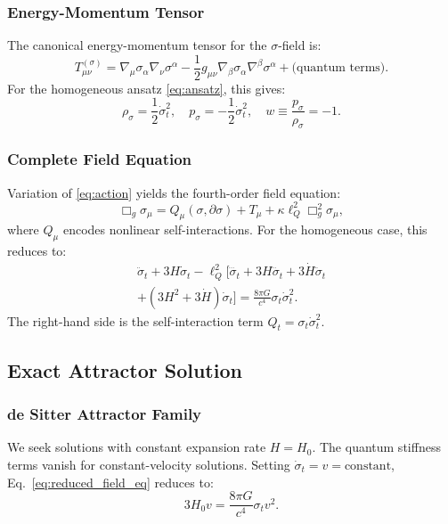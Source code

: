 \documentclass[11pt,a4paper]{article}
\theoremstyle{definition}
\theoremstyle{remark}
\begin{document}
	\subsubsection{Energy-Momentum Tensor}
	The canonical energy-momentum tensor for the $\sigma$-field is:
	\begin{equation}
		T^{(\sigma)}_{\mu\nu} = \nabla_\mu \sigma_\alpha \nabla_\nu \sigma^\alpha - \frac{1}{2} g_{\mu\nu} \nabla_\beta \sigma_\alpha \nabla^\beta \sigma^\alpha + \text{(quantum terms)}.
		\label{eq:energy_momentum}
	\end{equation}
	For the homogeneous ansatz \eqref{eq:ansatz}, this gives:
	\begin{equation}
		\rho_\sigma = \frac{1}{2} \dot{\sigma}_t^2, \quad p_\sigma = -\frac{1}{2} \dot{\sigma}_t^2, \quad w \equiv \frac{p_\sigma}{\rho_\sigma} = -1.
		\label{eq:eos}
	\end{equation}
	
	\subsubsection{Complete Field Equation}
	Variation of \eqref{eq:action} yields the fourth-order field equation:
	\begin{equation}
		\Box_g \sigma_\mu = Q_\mu(\sigma, \partial\sigma) + T_\mu + \kappa \ell_Q^2 \Box_g^2 \sigma_\mu,
		\label{eq:field_eq}
	\end{equation}
	where $Q_\mu$ encodes nonlinear self-interactions. For the homogeneous case, this reduces to:
	\begin{multline}
		\ddot{\sigma}_t + 3H \dot{\sigma}_t - \ell_Q^2 \Big[ \ddddot{\sigma}_t + 3H \dddot{\sigma}_t + 3\dot{H} \ddot{\sigma}_t \\
		+ (3H^2 + 3\dot{H}) \dot{\sigma}_t \Big] = \frac{8\pi G}{c^4} \sigma_t \dot{\sigma}_t^2.
		\label{eq:reduced_field_eq}
	\end{multline}
	The right-hand side is the self-interaction term $Q_t = \sigma_t \dot{\sigma}_t^2$.
	
	\subsection{Exact Attractor Solution}
	
	\subsubsection{de Sitter Attractor Family}
	We seek solutions with constant expansion rate $H = H_0$. The quantum stiffness terms vanish for constant-velocity solutions. Setting $\dot{\sigma}_t = v = \text{constant}$, Eq.~\eqref{eq:reduced_field_eq} reduces to:
	\begin{equation}
		3H_0 v = \frac{8\pi G}{c^4} \sigma_t v^2.
		\label{eq:balance}
	\end{equation}
	
\end{document}
